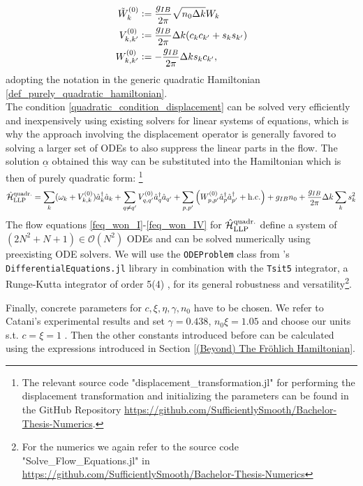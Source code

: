 \begin{subequations}
\begin{align}
\tilde W_k^{(0)}&\vcentcolon= \frac{g_{IB}}{2\pi}\sqrt{n_0\Delta k} W_k\\
V_{k,k^\prime}^{(0)}&\vcentcolon=\frac{g_{IB}}{2\pi}\Delta k(c_k c_{k^\prime}+s_{k}s_{k^\prime})\\
W_{k,k^\prime}^{(0)}&\vcentcolon= -\frac{g_{IB}}{2\pi}\Delta k s_k c_{k^\prime},
\end{align}
\end{subequations}
adopting the notation in the generic quadratic Hamiltonian \ref{def_purely_quadratic_hamiltonian}.\\
The condition \ref{quadratic_condition_displacement} can be solved very efficiently and inexpensively using existing solvers for linear systems of equations, which is why the approach involving the displacement operator is generally favored to solving a larger set of ODEs to also suppress the linear parts in the flow. The solution $\underline\alpha$ obtained this way can be substituted into the Hamiltonian which is then of purely quadratic form: \footnote{The relevant source code "displacement\_transformation.jl" for performing the displacement transformation and initializing the parameters can be found in the GitHub Repository \url{https://github.com/SufficientlySmooth/Bachelor-Thesis-Numerics}.}
\begin{equation}\label{Ham_LLP_qudratic}
\hat{\mathcal{H}}_{\mathrm{LLP}}^{\mathrm{quadr.}}=\sum\limits_k (\omega_k +V_{k,k}^{(0)})\hat a^\dagger_k\hat a_k+\sum\limits_{q\neq q^\prime}V_{q,q^\prime}^{(0)}\hat a^\dagger_q\hat a_{q^\prime}+\sum\limits_{p,p^\prime}\left(W_{p,p^\prime}^{(0)}\hat a^\dagger_p\hat a^\dagger_{p^\prime}+\mathrm{h.c.}\right)+g_{IB}n_0+\frac{g_{IB}}{2\pi}\Delta k\sum\limits_{k}s_k^2
\end{equation}
The flow equations \ref{feq_won_I}-\ref{feq_won_IV} for $\hat{\mathcal{H}}_{\mathrm{LLP}}^{\mathrm{quadr.}}$ define a system of $(2N^2+N+1)\in\mathcal O(N^2)$ ODEs and can be solved numerically using preexisting ODE solvers. We will use the \verb!ODEProblem! class from \julialogo's \verb!DifferentialEquations.jl! library in combination with the \verb!Tsit5! integrator, a Runge-Kutta integrator of order 5(4) \cite{TSITOURAS2011770}, for its general robustness and versatility\footnote{For the numerics we again refer to the source code "Solve\_Flow\_Equations.jl" in \url{https://github.com/SufficientlySmooth/Bachelor-Thesis-Numerics}}.\par
Finally, concrete parameters for $c,\xi,\eta,\gamma,n_0$ have to be chosen. We refer to Catani's experimental results and set $\gamma=0.438$, $n_0\xi=1.05$ and choose our units s.t. $c=\xi=1$ \cite{Catani,Grusdt_2017}.
Then the other constants introduced before can be calculated using the expressions introduced in Section \ref{(Beyond) The Fröhlich Hamiltonian}.
